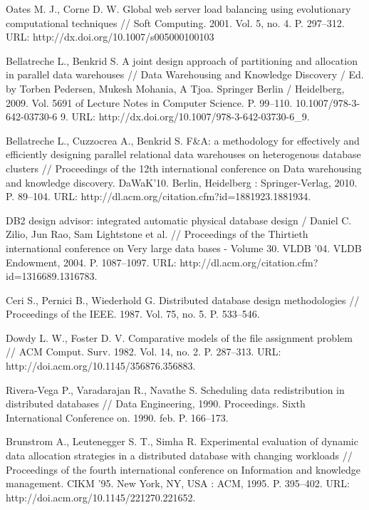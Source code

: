 \documentclass[unicode]{beamer}
\begin{document}
\begin{frame}[allowframebreaks]
{\begin{thebibliography}{99}
 Oates M. J., Corne D. W. Global web server load balancing using evolutionary computational techniques // Soft Computing. 2001. Vol. 5, no. 4. P. 297--312. URL: http://dx.doi.org/10.1007/s005000100103

 Bellatreche L., Benkrid S. A joint design approach of partitioning and allocation in parallel data warehouses // Data Warehousing and Knowledge Discovery / Ed. by Torben Pedersen, Mukesh Mohania, A Tjoa. Springer Berlin / Heidelberg, 2009. Vol. 5691 of Lecture Notes in Computer Science. P. 99--110. 10.1007/978-3-642-03730-6 9. URL: http://dx.doi.org/10.1007/978-3-642-03730-6\_9.

 Bellatreche L., Cuzzocrea A., Benkrid S. F\&{A}: a methodology for effectively and efficiently designing parallel relational data warehouses on heterogenous database clusters // Proceedings of the 12th international conference on Data warehousing and knowledge discovery. DaWaK’10. Berlin, Heidelberg : Springer-Verlag, 2010. P. 89--104. URL: http://dl.acm.org/citation.cfm?id=1881923.1881934.

 DB2 design advisor: integrated automatic physical database design / Daniel C. Zilio, Jun Rao, Sam Lightstone et al. // Proceedings of the Thirtieth international conference on Very large data bases - Volume 30. VLDB ’04. VLDB Endowment, 2004. P. 1087--1097. URL: http://dl.acm.org/citation.cfm?id=1316689.1316783.

 Ceri S., Pernici B., Wiederhold G. Distributed database design methodologies // Proceedings of the IEEE. 1987. Vol. 75, no. 5. P. 533--546.

 Dowdy L. W., Foster D. V. Comparative models of the file assignment problem // ACM Comput. Surv. 1982. Vol. 14, no. 2. P. 287–313. URL: http://doi.acm.org/10.1145/356876.356883.

 Rivera-Vega P., Varadarajan R., Navathe S. Scheduling data redistribution in distributed databases // Data Engineering, 1990. Proceedings. Sixth International Conference on. 1990. feb. P. 166--173.

 Brunstrom A., Leutenegger S. T., Simha R. Experimental evaluation of dynamic data allocation strategies in a distributed database with changing workloads // Proceedings of the fourth international conference on Information and knowledge management. CIKM ’95. New York, NY, USA : ACM, 1995. P. 395--402. URL: http://doi.acm.org/10.1145/221270.221652.


\end{thebibliography}}
\end{frame}
\end{document}
